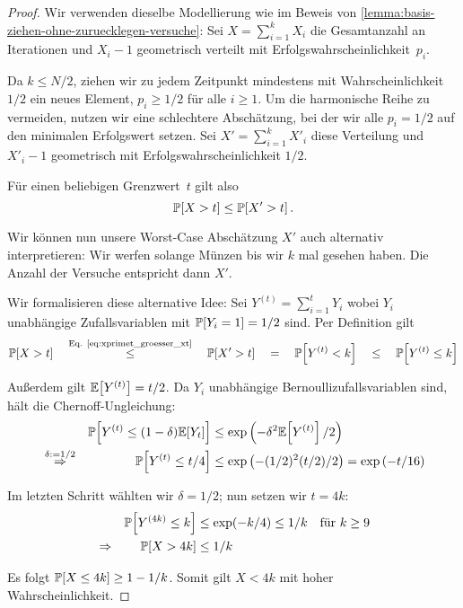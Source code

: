 \begin{proof}
    Wir verwenden dieselbe Modellierung wie im Beweis von \cref{lemma:basis-ziehen-ohne-zuruecklegen-versuche}:
    Sei $X = \sum_{i=1}^k X_i$ die Gesamtanzahl an Iterationen und $X_i - 1$ geometrisch verteilt mit Erfolgswahrscheinlichkeit~$p_i$.

    Da $k \le N/2$, ziehen wir zu jedem Zeitpunkt mindestens mit Wahrscheinlichkeit $1/2$ ein neues Element, \dh $p_i \ge 1/2$ für alle $i \ge 1$.
    Um die harmonische Reihe zu vermeiden, nutzen wir eine schlechtere Abschätzung, bei der wir alle $p_i = 1/2$ auf den minimalen Erfolgswert setzen.
    Sei $X' = \sum_{i=1}^k X'_i$ diese Verteilung und $X'_i - 1$ geometrisch mit Erfolgswahrscheinlichkeit $1/2$.

    \noindent
    Für einen beliebigen Grenzwert~$t$ gilt also
    \begin{equation}\label{eq:xprimet_groesser_xt}
        \mathbb{P}\!\left[X > t\right] \le \mathbb{P}\!\left[X' > t\right].
    \end{equation}

    Wir können nun unsere Worst-Case Abschätzung $X'$ auch alternativ interpretieren:
    Wir werfen solange Münzen bis wir $k$ mal  gesehen haben.
    Die Anzahl der Versuche entspricht dann $X'$.

    Wir formalisieren diese alternative Idee:
    Sei $Y^{(t)} = \sum_{i=1}^t Y_i$ wobei $Y_i$ unabhängige Zufallsvariablen mit $\mathbb{P}\!\left[Y_i = 1\right] = 1/2$ sind.
    Per Definition gilt
    \begin{equation}
        \mathbb{P}\!\left[X > t\right]
        \quad \stackrel{\text{Eq. \ref{eq:xprimet_groesser_xt}}}{\le} \quad
        \mathbb{P}\!\left[X' > t\right]
        \quad = \quad
        \mathbb{P}\!\left[Y^{(t)} < k\right]
        \quad \le \quad
        \mathbb{P}\!\left[Y^{(t)} \le k\right]
    \end{equation}

    \noindent
    Außerdem gilt $\mathbb{E}\!\left[Y^{(t)}\right] = t/2$.
    Da $Y_i$ unabhängige Bernoullizufallsvariablen sind, hält die Chernoff-Ungleichung:
    \begin{align}
         &                                     & \mathbb{P}\!\left[Y^{(t)} \le (1-\delta) \mathbb{E}\!\left[Y_t\right]\right] & \le \exp\left(-\delta^2 \mathbb{E}\!\left[Y^{(t)}\right] / 2\right)                  \\
         & \stackrel{\delta:=1/2}{\Rightarrow} & \mathbb{P}\!\left[Y^{(t)} \le t / 4\right]                 & \le \exp\left(-(1/2)^2 (t/2) / 2\right) = \exp\left( -t/16 \right)
    \end{align}

    \noindent Im letzten Schritt wählten wir $\delta = 1/2$; nun setzen wir $t = 4k$:
    \begin{align}
         &             & \mathbb{P}\!\left[Y^{(4k)} \le k\right] & \le \exp(-k/4) \le 1/k \quad \text{für } k \ge 9 \\
         & \Rightarrow & \mathbb{P}\!\left[X > 4k\right]         & \le 1/k
    \end{align}

    \noindent
    Es folgt $\mathbb{P}\!\left[X \le 4k\right] \ge 1 - 1/k$. Somit gilt $X < 4k$ mit hoher Wahrscheinlichkeit.
\end{proof}

